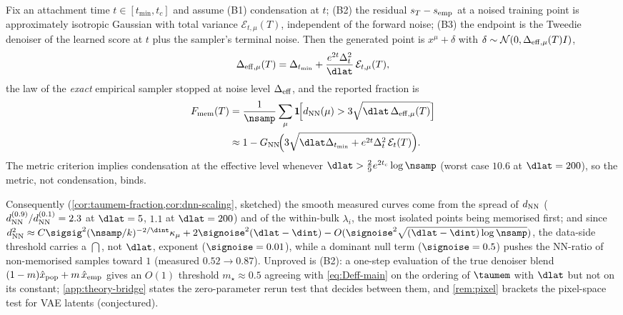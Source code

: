 \begin{proposition}\label{prop:bridge-main}
Fix an attachment time $t\in[t_{\min},t_c]$ and assume (B1) condensation at $t$; (B2) the residual $s_T-s_{\rm emp}$ at a noised training point is approximately isotropic Gaussian with total variance $\mathcal E_{t,\mu}(T)$, independent of the forward noise; (B3) the endpoint is the Tweedie denoiser of the learned score at $t$ plus the sampler's terminal noise. Then the generated point is $x^\mu+\delta$ with $\delta\sim\mathcal N(0,\Delta_{\rm eff,\mu}(T)I)$,
\begin{equation}\label{eq:Deff-main}
\Delta_{\rm eff,\mu}(T)=\Delta_{t_{\min}}+\frac{e^{2t}\Delta_t^{2}}{\dlat}\,\mathcal E_{t,\mu}(T),
\end{equation}
the law of the \emph{exact} empirical sampler stopped at noise level $\Delta_{\rm eff}$, and the reported fraction is
\begin{align}
F_{\rm mem}(T)&=\frac1\nsamp\sum_\mu\mathbf 1\!\Bigl[d_{\rm NN}(\mu)>3\sqrt{\dlat\,\Delta_{\rm eff,\mu}(T)}\Bigr]\label{eq:Fmem-main}\\
&\approx1-G_{\rm NN}\!\Bigl(3\sqrt{\dlat\Delta_{t_{\min}}+e^{2t}\Delta_t^{2}\,\mathcal E_t(T)}\Bigr).\nonumber
\end{align}
The metric criterion implies condensation at the effective level whenever $\dlat>\tfrac29e^{2t_c}\log\nsamp$ (worst case $10.6$ at $\dlat=200$), so the metric, not condensation, binds.
\end{proposition}
Consequently (\cref{cor:taumem-fraction,cor:dnn-scaling}, sketched) the smooth measured curves come from the spread of $d_{\rm NN}$ ($d^{(0.9)}_{\rm NN}/d^{(0.1)}_{\rm NN}=2.3$ at $\dlat=5$, $1.1$ at $\dlat=200$) and of the within-bulk $\lambda_i$, the most isolated points being memorised first; and since $d_{\rm NN}^2\approx C\sigsig^2(\nsamp/k)^{-2/\dint}\kappa_\mu+2\signoise^2(\dlat-\dint)-O(\signoise^2\sqrt{(\dlat-\dint)\log\nsamp})$, the data-side threshold carries a $\dint$, not $\dlat$, exponent ($\signoise=0.01$), while a dominant null term ($\signoise=0.5$) pushes the NN-ratio of non-memorised samples toward $1$ (measured $0.52\to0.87$). Unproved is (B2): a one-step evaluation of the true denoiser blend $(1-m)\hat x_{\rm pop}+m\,\hat x_{\rm emp}$ gives an $O(1)$ threshold $m_\star\approx0.5$ agreeing with \eqref{eq:Deff-main} on the ordering of $\taumem$ with $\dlat$ but not on its constant; \cref{app:theory-bridge} states the zero-parameter rerun test that decides between them, and \cref{rem:pixel} brackets the pixel-space test for VAE latents (conjectured).

